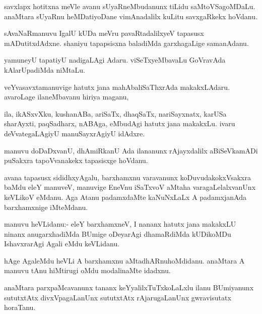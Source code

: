 \documentclass{article}
\begin{document}
\begin{mn}
savxlapx hotitxna meVle avanu sUyaRneMbudanunx tiLidu
saMtoVSagoMDaLu. anaMtara sUyaRnu heMDatiyoDane vimAnadalilx kuLitu
savxgaRkekx hoVdanu.
\end{mn}

\begin{mn}
sAvaNaRmanuvu IgalU kUDa meVru pavaRtadalilxyeV tapasusx
mADutitxdAdxne. shaniyu tapapsisxna baladiMda garxhagaLige samanAdanu.
\end{mn}

\begin{mn}%
yamuneyU tapatiyU nadigaLAgi Adaru. viSeTxyeMbavaLu GoVravAda
kAlarUpadiMda niMtaLu.
\end{mn}

\begin{mn}
veYvasavxtamanuvige hatutx jana mahAbaliSaThxrAda
makakxLAdaru. avaroLage ilaneMbavanu hiriya maganu,
\end{mn}

\begin{mn}
ila, ikASxvXku, kushanABa, ariSaTx, dhaqSaTx, nariSayxnatx, karUSa
sharAyxti, paqSadharx, nABAga, eMbudAgi hatutx jana makakxLu. ivaru
deVvategaLAgiyU manuSayxrAgiyU idAdxre.
\end{mn}

\begin{mn}
manuvu doDaDxvanU, dhAmiRkanU Ada ilananunx rAjayxdalilx aBiSeVkamADi
puSakxra tapoVvanakekx tapasisxge hoVdanu.
\end{mn}

\begin{mn}%
avana tapasusx sididhxyAgalu, barxhamxnu varavanunx
koDuvudakokxVsakxra baMdu eleY manuveV, manuvige EneVnu iSaTxvoV
aMtaha varagaLelalxvanUnx keVLikoV eMdanu. Aga Atanu padamxdaMte
kaNuNxLaLx A padamxjanAda barxhamxnige iMteMdanu.
\end{mn}

\begin{mn}%
manuvu heVLidanu:- eleY barxhamxneV, I nananx hatutx jana makakxLU
ninanx anugarxhadiMda BUmige oDeyarAgi dhamaRdiMda kUDikoMDu
IshavxrarAgi Agali eMdu keVLidanu.
\end{mn}

\begin{mn}
hAge AgaleMdu heVLi A barxhamxnu aMtadhARnuhoMdidanu. anaMtara A
manuvu tAnu hiMtirugi oMdu modalinaMte idadxnu.
\end{mn}

\begin{mn}
anaMtara parxpaMcavanunx tananx keYyalilxTuTxkoLaLxlu ilanu BUmiyanunx
sututxtAtx divxVpagaLanUnx sututxtAtx rAjarugaLanUnx gwravisutatx horaTanu.
\end{mn}
\end{document}
